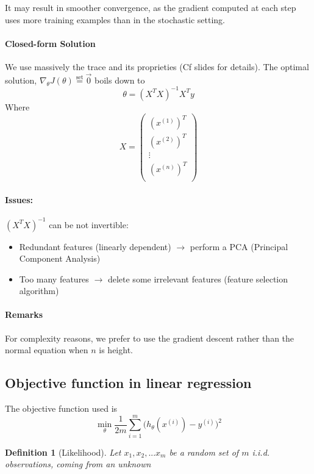 \documentclass{article}
\newtheorem{defi}{Definition}
\begin{document}
It may result in smoother convergence, as the gradient computed at each step uses more training examples than in the stochastic setting.



\paragraph{Closed-form Solution}
We use massively the trace and its proprieties (Cf slides for details).
The optimal solution, $\nabla_\theta J(\theta)\overset{\text{set}}{=} \vec{0}$ boils down to
\[\theta = (X^TX)^{-1}X^Ty\]
Where
\[X= \begin{pmatrix}
(x^{(1)})^T \\
(x^{(2)})^T \\
\vdots\\
(x^{(n)})^T\\
\end{pmatrix}
\]

\paragraph{Issues:}
$(X^TX)^{-1}$ can be not invertible:
\begin{itemize}
\item Redundant features (linearly dependent) $\to$ perform a PCA (Principal Component Analysis)
\item Too many features $\to$ delete some irrelevant features (feature selection algorithm)
\end{itemize}

\paragraph{Remarks}
For complexity reasons, we prefer to use the gradient descent rather than the normal equation when $n$ is height.

\subsection{Objective function in linear regression}
The objective function used is
\[ \min_{\theta}  \frac{1}{2m} \sum_{i=1}^m \Big(h_\theta (x^{(i)}) - y^{(i)} \Big)^2\]

\begin{defi}[Likelihood]
Let $x_1, x_2, ... x_m$ be a random set of $m$ i.i.d. observations, coming from an unknown

\end{defi}
\end{document}
